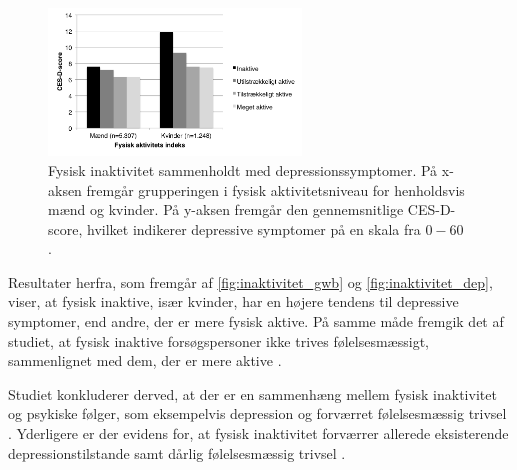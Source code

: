 \begin{figure}[H]
\centering
\includegraphics[width=0.6\textwidth]{figures/inaktivitet_dep}
\caption{Fysisk inaktivitet sammenholdt med depressionssymptomer. På x-aksen fremgår grupperingen i fysisk aktivitetsniveau for henholdsvis mænd og kvinder. På y-aksen fremgår den gennemsnitlige CES-D-score, hvilket indikerer depressive symptomer på en skala fra $0-60$ \citep{galper2006}.}
\label{fig:inaktivitet_dep}
\end{figure}

\noindent
Resultater herfra, som fremgår af \autoref{fig:inaktivitet_gwb} og \autoref{fig:inaktivitet_dep}, viser, at fysisk inaktive, især kvinder, har en højere tendens til depressive symptomer, end andre, der er mere fysisk aktive. På samme måde fremgik det af studiet, at fysisk inaktive forsøgspersoner  ikke trives følelsesmæssigt, sammenlignet med dem, der er mere aktive \citep{galper2006}. 

Studiet konkluderer derved, at der er en sammenhæng mellem fysisk inaktivitet og psykiske følger, som eksempelvis depression og forværret følelsesmæssig trivsel \citep{galper2006}. Yderligere er der evidens for, at fysisk inaktivitet forværrer allerede eksisterende depressionstilstande samt dårlig følelsesmæssig trivsel \citep{motionsraad2007}.
